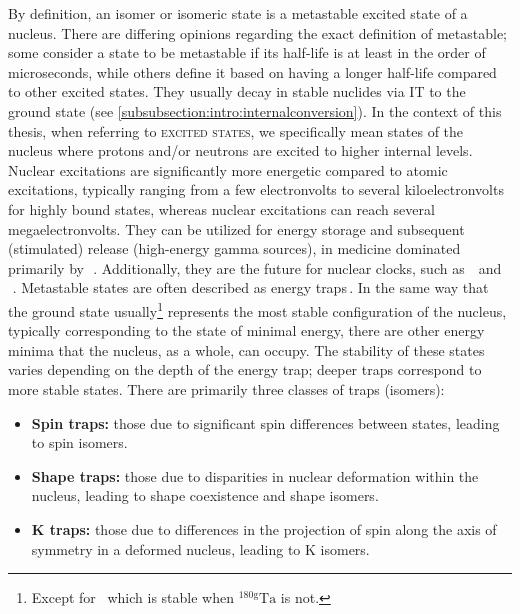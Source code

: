 By definition, an isomer or isomeric state is a metastable excited state of a nucleus. 
There are differing opinions regarding the exact definition of metastable; some consider a state to be metastable if its half-life is at least in the order of microseconds, while others define it based on having a longer half-life compared to other excited states. They usually decay in stable nuclides via \textsc{IT} to the ground state (see \cref{subsubsection:intro:internalconversion}).  
\newpar
In the context of this thesis, when referring to \textsc{excited states}, we specifically mean states of the nucleus where protons and/or neutrons are excited to higher internal levels. Nuclear excitations are significantly more energetic compared to atomic excitations, typically ranging from a few electronvolts to several kiloelectronvolts for highly bound states, whereas nuclear excitations can reach several megaelectronvolts.
\newpar
They can be utilized for energy storage \cite{WalkerCarroll} and subsequent (stimulated) release \cite{CARROLLrelease} (high-energy gamma sources), in medicine dominated primarily by \,\,\cite{99mTcMedicine}. Additionally, they are the future for nuclear clocks, such as \,\,\cite{Seiferle2019,Kraemer2023} and \,\,\cite{Shvydko2023}.
\newpar
{}
Metastable states are often described as energy traps\,\cite{Walker1999}. In the same way that the ground state usually\footnote{Except for \, which is stable when $^{180\mathrm{g}}\mathrm{Ta}$ is not.} represents the most stable configuration of the nucleus, typically corresponding to the state of minimal energy, there are other energy minima that the nucleus, as a whole, can occupy. The stability of these states varies depending on the depth of the energy trap; deeper traps correspond to more stable states.
\newpar
There are primarily three classes of traps (isomers): 
\begin{itemize}
    \item {\bf Spin traps:} those due to significant spin differences between states, leading to spin isomers.
    \item {\bf Shape traps:} those due to disparities in nuclear deformation within the nucleus, leading to shape coexistence and shape isomers.
    \item {\bf K traps:} those due to differences in the projection of spin along the axis of symmetry in a deformed nucleus, leading to K isomers.
\end{itemize}

